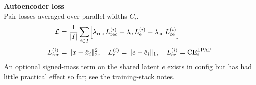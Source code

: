 \documentclass[preview,border=10pt]{standalone}
\begin{document}
\begin{minipage}{0.98\linewidth}
{\large\bfseries Autoencoder loss}\\[0.45em]
{\footnotesize
Pair losses averaged over parallel widths $C_i$.
}\\[0.7em]
\[
\setlength{\jot}{0.55em}
\begin{aligned}
\mathcal{L}
&=
\frac{1}{|I|}\sum_{i\in I}
\Bigl[
  \lambda_{\mathrm{rec}}\,L_{\mathrm{rec}}^{(i)}
  +
  \lambda_{\mathrm{e}}\,L_{\mathrm{e}}^{(i)}
  +
  \lambda_{\mathrm{ce}}\,L_{\mathrm{ce}}^{(i)}
\Bigr]
\\
L_{\mathrm{rec}}^{(i)}
&=
\lVert x-\hat{x}_i\rVert_2^{2},
\quad
L_{\mathrm{e}}^{(i)}
=
\lVert e-\hat{e}_i\rVert_1,
\quad
L_{\mathrm{ce}}^{(i)}
=
\mathrm{CE}_{i}^{\mathrm{LPAP}}
\end{aligned}
\]
\vspace{0.35em}
{\footnotesize
An optional signed-mass term on the shared latent $e$ exists in config but has
had little practical effect so far; see the training-stack notes.
}
\end{minipage}
\end{document}
